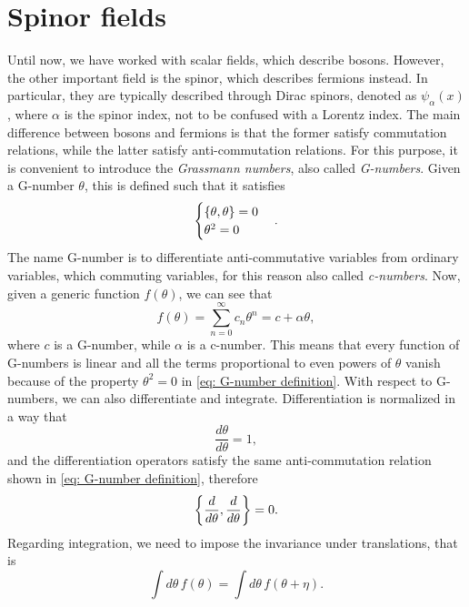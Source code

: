 \section{Spinor fields}
Until now, we have worked with scalar fields, which describe bosons. However, the other important field is the spinor, which describes fermions instead. In particular, they are typically described through Dirac spinors, denoted as $\psi_\alpha(x)$, where $\alpha$ is the spinor index, not to be confused with a Lorentz index. The main difference between bosons and fermions is that the former satisfy commutation relations, while the latter satisfy anti-commutation relations. For this purpose, it is convenient to introduce the \emph{Grassmann numbers}, also called \emph{G-numbers}. Given a G-number $\theta$, this is defined such that it satisfies 
\begin{equation}
\label{eq: G-number definition}
    \begin{cases}
        \{\theta,\theta\} = 0 \\
        \theta^2 = 0
    \end{cases}.
\end{equation}
The name G-number is to differentiate anti-commutative variables from ordinary variables, which commuting variables, for this reason also called \emph{c-numbers}. Now, given a generic function $f(\theta)$, we can see that 
\begin{equation}
    f(\theta) = \sum_{n = 0}^\infty c_n\theta^n = c + \alpha\theta,
\end{equation}
where $c$ is a G-number, while $\alpha$ is a c-number. This means that every function of G-numbers is linear and all the terms proportional to even powers of $\theta$ vanish because of the property $\theta^2 = 0$ in \eqref{eq: G-number definition}. With respect to G-numbers, we can also differentiate and integrate. Differentiation is normalized in a way that 
\begin{equation}
\label{eq: normalization of G-number's derivation}
    \frac{d\theta}{d\theta} = 1,
\end{equation}
and the differentiation operators satisfy the same anti-commutation relation shown in \eqref{eq: G-number definition}, therefore
\begin{equation}
    \bigg\{\frac{d}{d\theta},\frac{d}{d\theta}\bigg\} = 0.
\end{equation}
Regarding integration, we need to impose the invariance under translations, that is 
\begin{equation}
    \int d\theta\,f(\theta) = \int d\theta\,f(\theta + \eta).
\end{equation}

